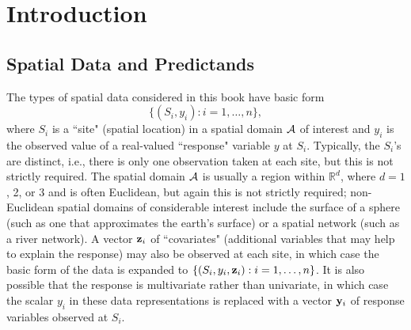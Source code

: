 \chapter{Introduction}


\section{Spatial Data and Predictands}

The types of spatial data considered in this book have basic form
\[ \{(S_i,y_i):i=1,\ldots,n\}, \]
where $S_i$ is a ``site" (spatial location) in a spatial domain ${\cal A}$ of interest and $y_i$ is the observed value of a real-valued ``response" variable $y$ at $S_i$.  Typically, the $S_i$'s are distinct, i.e., there is only one observation taken at each site, but this is not strictly required.  The spatial domain ${\cal A}$ is usually a region within $\mathbb{R}^d$, where $d=1$, 2, or 3 and is often Euclidean, but again this is not strictly required; non-Euclidean spatial domains of considerable interest include the surface of a sphere (such as one that approximates the earth's surface) or a spatial network (such as a river network).  A vector ${\bf z}_i$ of ``covariates" (additional variables that may help to explain the response) may also be observed at each site, in which case the basic form of the data is expanded to $\{(S_i,y_i,{\bf z}_i):i=1,\ldots,n\}$.  It is also possible that the response is multivariate rather than univariate, in which case the scalar $y_i$ in these data representations is replaced with a vector ${\bf y}_i$ of response variables observed at $S_i$.   


